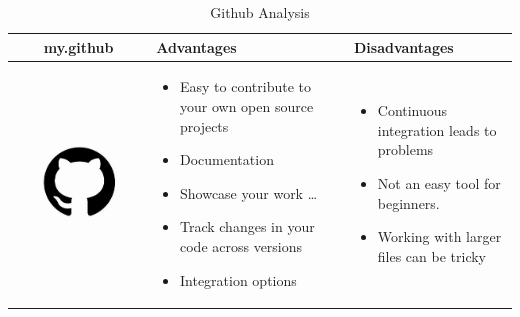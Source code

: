 \documentclass{article}
\begin{document}
	
\begin{table}[h!]
	\centering
	\begin{tabular}{ | c | m{5cm} | m{5cm} | }
		\hline
	my.github & Advantages & Disadvantages \\ \hline
	\begin{minipage}{.4\textwidth}
		\includegraphics[width=\linewidth, height=40mm]{github}
	\end{minipage}
    &
    \begin{itemize}
    	\item Easy to contribute to your own open source projects
    	\item Documentation
    	\item Showcase your work \ldots
    	\item Track changes in your code across versions
    	\item Integration options 
    \end{itemize}
    &
    \begin{itemize}
    	\item Continuous integration leads to problems
    	\item Not an easy tool for beginners.
    	\item Working with larger files can be tricky
    \end{itemize}
    \\ \hline
    \end{tabular}
    \caption{Github Analysis}\label{tbl:mygithub}
\end{table}
    
\end{document}

